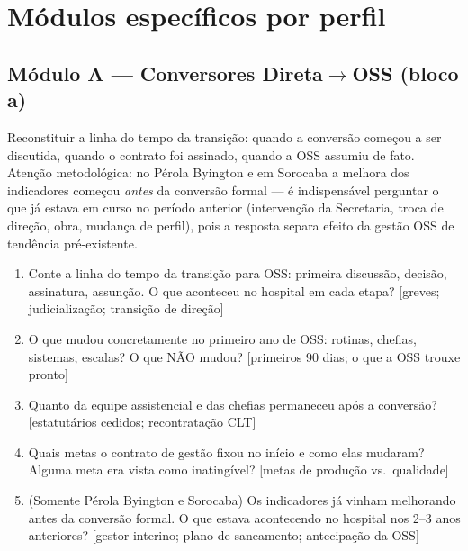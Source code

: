 \documentclass[12pt,a4paper]{article}
\newcommand{\achado}[1]{%
  \noindent{\small\itshape\textcolor{black!60}{Achado que a pergunta
  testa: #1}}\par\smallskip}
\begin{document}
\section{Módulos específicos por perfil}
\label{sec:modulos}

\subsection{Módulo A --- Conversores Direta$\to$OSS (bloco a)}

Reconstituir a linha do tempo da transição: quando a conversão começou a
ser discutida, quando o contrato foi assinado, quando a OSS assumiu de
fato. Atenção metodológica: no Pérola Byington e em Sorocaba a melhora
dos indicadores começou \emph{antes} da conversão formal --- é
indispensável perguntar o que já estava em curso no período anterior
(intervenção da Secretaria, troca de direção, obra, mudança de perfil),
pois a resposta separa efeito da gestão OSS de tendência pré-existente.

\begin{enumerate}[itemsep=2pt]
  \item Conte a linha do tempo da transição para OSS: primeira discussão, decisão, assinatura, assunção. O que aconteceu no hospital em cada etapa? [greves; judicialização; transição de direção]
  \par\nopagebreak\achado{as datas de conversão da proxy (2019, 2023 e três em 2025) vêm do cadastro; a linha do tempo real pode antecedê-las e reinterpretar o estudo de eventos.}
  \item O que mudou concretamente no primeiro ano de OSS: rotinas, chefias, sistemas, escalas? O que NÃO mudou? [primeiros 90 dias; o que a OSS trouxe pronto]
  \par\nopagebreak\achado{no estudo de eventos, o TMP cai já nos primeiros anos pós; a pergunta identifica qual prática explica a queda rápida.}
  \item Quanto da equipe assistencial e das chefias permaneceu após a conversão? [estatutários cedidos; recontratação CLT]
  \par\nopagebreak\achado{continuidade de equipe distingue efeito de gestão de efeito de composição --- se a equipe é a mesma, a mudança é de método, não de pessoas.}
  \item Quais metas o contrato de gestão fixou no início e como elas mudaram? Alguma meta era vista como inatingível? [metas de produção vs.\ qualidade]
  \par\nopagebreak\achado{produção $+$43,7\% (transversal) e TMP $-$10,2\% within: as metas contratuais são a explicação institucional candidata.}
  \item (Somente Pérola Byington e Sorocaba) Os indicadores já vinham melhorando antes da conversão formal. O que estava acontecendo no hospital nos 2--3 anos anteriores? [gestor interino; plano de saneamento; antecipação da OSS]
  \par\nopagebreak\achado{a melhora pré-conversão observada nesses dois hospitais ameaça a leitura causal do estudo de eventos; a resposta decide entre antecipação, tendência ou seleção.}
\end{enumerate}
\end{document}
